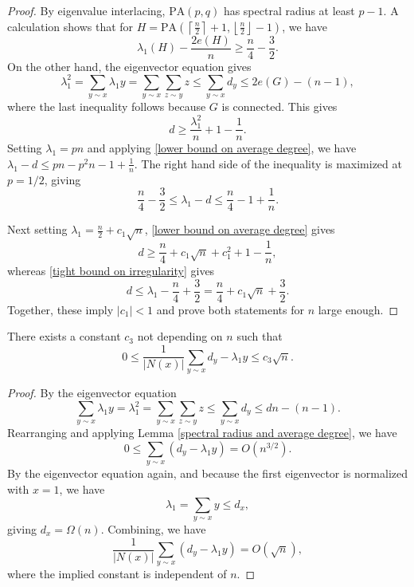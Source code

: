 \begin{proof}
By eigenvalue interlacing, $\mathrm{PA}(p,q)$ has spectral radius at least $p-1$. A calculation shows 
that for $H = \mathrm{PA}\left( \left\lceil \frac{n}{2}\right\rceil +1, \left\lfloor\frac{n}{2}\right\rfloor-1\right)$, we have 
\[
\lambda_1(H) - \frac{2e(H)}{n} \geq \frac{n}{4} - \frac{3}{2}.
\]
On the other hand, the eigenvector equation gives 
\[
\lambda_1^2 = \sum_{y\sim x} \lambda_1 y = \sum_{y\sim x}\sum_{z\sim y} z \leq \sum_{y\sim x}d_y \leq 2e(G) - (n-1),
\]
where the last inequality follows because $G$ is connected. This gives
\begin{equation}\label{lower bound on average degree}
d \geq \frac{\lambda_1^2}{n} + 1 - \frac{1}{n}.
\end{equation}
Setting $\lambda_1 = pn$ and applying \eqref{lower bound on average degree}, we have $\lambda_1 - d \leq pn - p^2n -1 + \frac{1}{n}$. The right hand side of the inequality is maximized at $p=1/2$, giving 
\begin{equation}\label{tight bound on irregularity}
\frac{n}{4} - \frac{3}{2} \leq \lambda_1 - d \leq \frac{n}{4} - 1 + \frac{1}{n}.
\end{equation}

Next setting $\lambda_1 = \frac{n}{2} + c_1 \sqrt{n}$, \eqref{lower bound on average degree} gives
\[
d \geq \frac{n}{4} + c_1\sqrt{n} + c_1^2 + 1 - \frac{1}{n},
\]
whereas \eqref{tight bound on irregularity} gives
\begin{equation}\label{d bar bound}
d \leq \lambda_1 - \frac{n}{4} + \frac{3}{2}  = \frac{n}{4} + c_1\sqrt{n}  + \frac{3}{2}.
\end{equation}
Together, these imply $|c_1| <1$ and prove both statements for $n$ large enough.
\end{proof}

\begin{lemma}\label{error in x neighborhood small}
There exists a constant $c_3$ not depending on $n$ such that 
\[
0 \leq \frac{1}{|N(x)|} \sum_{y\sim x} d_y - \lambda_1 y \leq c_3\sqrt{n}.
\]
\end{lemma}

\begin{proof}
By the eigenvector equation
\[
\sum_{y\sim x} \lambda_1 y = \lambda_1^2 = \sum_{y\sim x}\sum_{z\sim y} z \leq \sum_{y\sim x} d_y \leq dn - (n-1).
\]
Rearranging and applying Lemma \ref{spectral radius and average degree}, we have
\[
0\leq \sum_{y\sim x} \left( d_y - \lambda_1 y \right) = O\left(n^{3/2}\right).
\]
By the eigenvector equation again, and because the first eigenvector is normalized with $x=1$, we have
\[
\lambda_1 = \sum_{y\sim x} y \leq d_x,
\]
giving $d_x = \Omega(n)$. Combining, we have 
\[
\frac{1}{|N(x)|} \sum_{y\sim x} \left( d_y - \lambda_1 y \right) = O\left(\sqrt{n}\right),
\]
where the implied constant is independent of $n$.
\end{proof}

